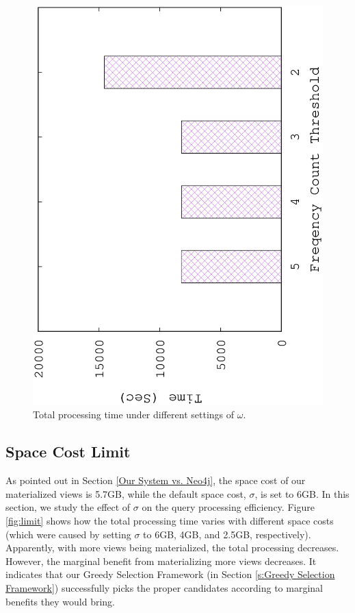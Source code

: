 	\begin{figure}[H]
		\centering
		\includegraphics[scale=0.5, angle=270]{plot/omega}
		\caption{Total processing time under different settings of $\omega$.}
		\label{fig:omega}
	\end{figure}
	
	
	\subsection{Space Cost Limit}
	\label{Space Cost Limit}
	As pointed out in Section \ref{Our System vs. Neo4j}, the space cost of our materialized views is 5.7GB, while the default space cost, $\sigma$, is set to 6GB. In this section, we study the effect of $\sigma$ on the query processing efficiency.  Figure \ref{fig:limit} shows how the total processing time varies with different space costs (which were caused by setting $\sigma$ to 6GB, 4GB, and 2.5GB, respectively). Apparently,  with more views being materialized, the total processing decreases. However, the marginal benefit from materializing more views decreases. It indicates that our Greedy Selection Framework (in Section \ref{s:Greedy Selection Framework}) successfully picks the proper candidates according to marginal benefits they would bring.
	
